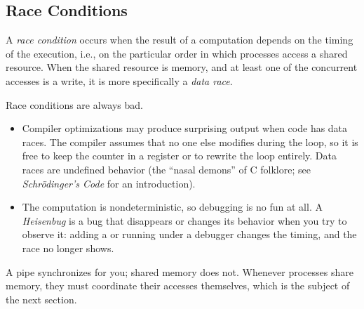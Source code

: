 \subsection{Race Conditions}

\begin{definition}
  A \emph{race condition} occurs when the result of a computation depends on the timing of the execution, i.e., on the particular order in which processes access a shared resource. When the shared resource is memory, and at least one of the concurrent accesses is a write, it is more specifically a \emph{data race}.
\end{definition}

Race conditions are always bad.
\begin{itemize}
  \item Compiler optimizations may produce surprising output when code has data races. The compiler assumes that no one else modifies  during the loop, so it is free to keep the counter in a register or to rewrite the loop entirely. Data races are undefined behavior (the ``nasal demons'' of C folklore; see \emph{Schrödinger's Code} for an introduction).
  \item The computation is nondeterministic, so debugging is no fun at all. A \emph{Heisenbug} is a bug that disappears or changes its behavior when you try to observe it: adding a  or running under a debugger changes the timing, and the race no longer shows.
\end{itemize}

\begin{keypoint}
  A pipe synchronizes for you; shared memory does not. Whenever processes share memory, they must coordinate their accesses themselves, which is the subject of the next section.
\end{keypoint}
